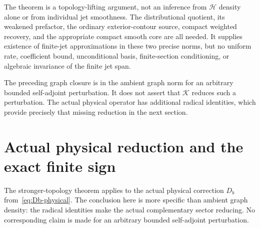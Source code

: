 \documentclass[11pt,a4paper]{article}
\numberwithin{equation}{section}
\theoremstyle{definition}\newtheorem{definition}[theorem]{Definition}
\theoremstyle{remark}\newtheorem{remark}[theorem]{Remark}
\newcommand{\Hh}{\mathcal H}\newcommand{\Hw}{\mathcal H}
\newcommand{\Kk}{\mathcal K}\newcommand{\Aa}{\mathcal A}\newcommand{\Ff}{\mathcal F}
\begin{document}
The theorem is a topology-lifting argument, not an inference from $\Hh$ density alone or from individual jet smoothness. The distributional quotient, its weakened prefactor, the ordinary exterior-contour source, compact weighted recovery, and the appropriate compact smooth core are all needed. It supplies existence of finite-jet approximations in these two precise norms, but no uniform rate, coefficient bound, unconditional basis, finite-section conditioning, or algebraic invariance of the finite jet span.


The preceding graph closure is in the ambient graph norm for an arbitrary bounded self-adjoint perturbation. It does not assert that $\Kk$ reduces such a perturbation. The actual physical operator has additional radical identities, which provide precisely that missing reduction in the next section.


\section{Actual physical reduction and the exact finite sign}\label{sec:actual-jets}
The stronger-topology theorem applies to the actual physical correction $D_b$ from~\eqref{eq:Db-physical}. The conclusion here is more specific than ambient graph density: the radical identities make the actual complementary sector reducing. No corresponding claim is made for an arbitrary bounded self-adjoint perturbation.
\end{document}
